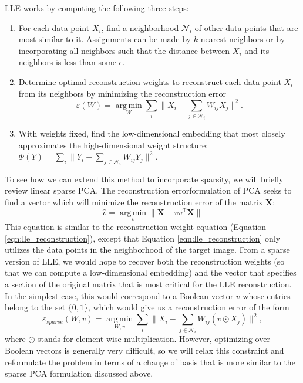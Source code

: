 \documentclass[11pt]{nih}
\begin{document}
LLE works by computing the following three steps: 
\begin{enumerate}
\item For each data point $X_i$, find a neighborhood $\mathcal{N}_i$ of other data points that are most similar to it.  Assignments can be made by $k$-nearest neighbors or by incorporating all neighbors such that the distance between $X_i$ and its neighbors is less than some $\epsilon$. 
\item Determine optimal reconstruction weights to reconstruct each data point $X_i$ from its neighbors by minimizing the reconstruction error
\begin{equation} 
\varepsilon \left(W\right) = \underset{W} {\operatorname{arg \, min}} \sum_i \| X_i - \sum_{j \in \mathcal{N}_i}W_{ij}X_j \|^2.
\label{eqn:lle_reconstruction}
 \end{equation}
\item With weights fixed, find the low-dimensional embedding that most closely approximates the high-dimensional weight structure: $\Phi \left(Y \right) = \sum_i \|Y_i - \sum_{j \in \mathcal{N}_i} W_{ij}Y_j \|^2$. 
\end{enumerate}
To see how we can extend this method to incorporate sparsity, we will briefly review linear sparse PCA.  The reconstruction errorformulation of PCA seeks to find a vector which will minimize the reconstruction error of the matrix $\mathbf{X}$: 
\begin{equation}
\hat{v} = \underset{v}{\operatorname{arg\, min}} \| \mathbf{X} - v v^{\mathrm{T}} \mathbf{X}\|
\end{equation}
This equation is similar to the reconstruction weight equation (Equation \ref{eqn:lle_reconstruction}), except that Equation \ref{eqn:lle_reconstruction} only utilizes the data points in the neighborhood of the target image.  From a sparse version of LLE, we would hope to recover both the reconstruction weights (so that we can compute a low-dimensional embedding) and the vector that specifies a section of the original matrix that is most critical for the LLE reconstruction.  In the simplest case, this would correspond to a Boolean vector $v$ whose entries belong to the set $\lbrace 0,1 \rbrace$, which would give us a reconstruction error of the form 
\begin{equation}
\varepsilon_{sparse} \left( W, v \right) = \underset{W, v}{\operatorname{arg\, min}} \sum_i \|X_i - \sum_{j \in \mathcal{N}_i} W_{ij} \left(v \odot X_j \right) \|^2,
\end{equation}
 where $\odot$ stands for element-wise multiplication.  However, optimizing over Boolean vectors is generally very difficult, so we will relax this constraint and reformulate the problem in terms of a change of basis that is more similar to the sparse PCA formulation discussed above. 
 
\end{document}
